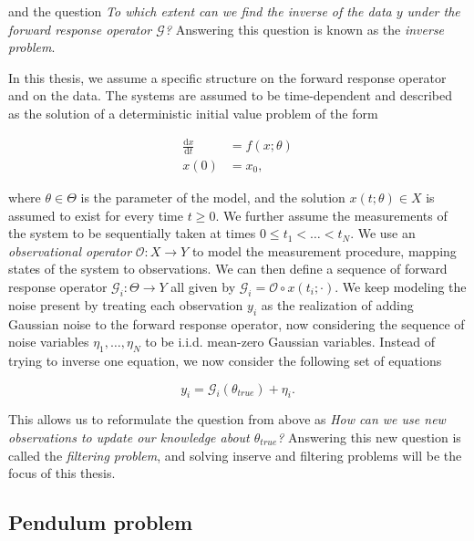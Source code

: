 and the question \textit{To which extent can we find the \textit{inverse} of the data $y$ under the forward response operator $\mathcal{G}$?} Answering this question is known as the \textit{inverse problem}.

In this thesis, we assume a specific structure on the forward response operator and on the data. The systems are assumed to be time-dependent and described as the solution of a deterministic initial value problem of the form

\begin{equation}
  \begin{aligned}
    \frac{\text{d}x}{\text{d}t} &= f(x; \theta)\\
    x(0) &= x_0,
  \end{aligned}
\end{equation}  

where $\theta \in \Theta$ is the parameter of the model, and the solution $x(t; \theta) \in X$ is assumed to exist for every time $t \geq 0$. We further assume the measurements of the system to be sequentially taken at times  $0 \leq t_1 < \ldots < t_N$. We use an \textit{observational operator} $\mathcal{O} : X \rightarrow Y$ to model the measurement procedure, mapping states of the system to observations. We can then define a sequence of forward response operator $\mathcal{G}_i : \Theta \rightarrow Y$ all given by $\mathcal{G}_i = \mathcal{O} \circ x(t_i; \cdot)$. We keep modeling the noise present by treating each observation $y_i$ as the realization of adding Gaussian noise to the forward response operator, now considering the sequence of noise variables $\eta_1, \ldots, \eta_N$ to be i.i.d. mean-zero Gaussian variables. Instead of trying to inverse one equation, we now consider the following set of equations

\begin{equation}
  y_i = \mathcal{G}_i(\theta_{true}) + \eta_i.
\end{equation}

This allows us to reformulate the question from above as \textit{How can we use new observations to update our knowledge about $\theta_{true}$?} Answering this new question is called the \textit{filtering problem}, and solving inserve and filtering problems will be the focus of this thesis.

\subsection{Pendulum problem}

